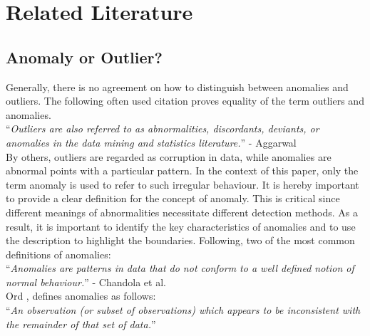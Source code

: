 
\chapter{Related Literature} \label{relatedLiterature} %

\label{2.} %


\section{Anomaly or Outlier?} \label{anomalies}

Generally, there is no agreement on how to distinguish between anomalies and outliers. The following often used citation proves equality of the term outliers and anomalies.\\

\noindent\enquote{\itshape Outliers are also referred to as abnormalities, discordants, deviants, or anomalies in the data mining
	and statistics literature.} - Aggarwal \parencite*{Aggarwal2013}\\

By others, outliers are regarded as corruption in data, while anomalies are abnormal points with a particular pattern. 
In the context of this paper, only the term anomaly is used to refer to such irregular behaviour. It is hereby important to provide a clear definition for the concept of anomaly. This is critical since different meanings of abnormalities necessitate different detection methods. As a result, it is important to identify the key characteristics of anomalies and to use the description to highlight the boundaries. Following, two of the most common definitions of anomalies:\\

\noindent\enquote{\itshape Anomalies are patterns in data that do not conform to a well defined notion of normal behaviour.} - Chandola et al. \parencite*{Chandola2009}\\

Ord \parencite*{Ord1996}, defines anomalies as follows:\\

\noindent\enquote{\itshape An observation (or subset of observations) which appears to be inconsistent with the remainder of that set of data.}\\

